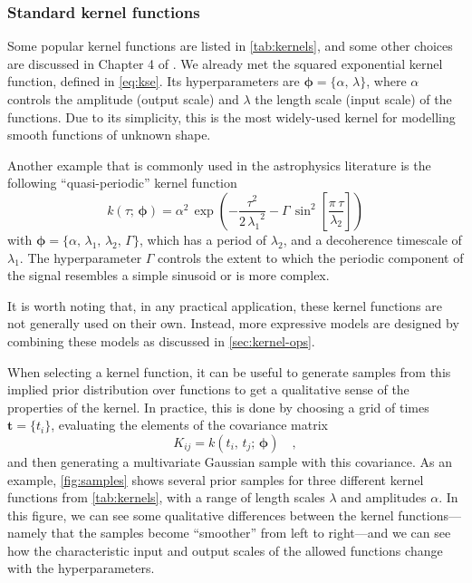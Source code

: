 \documentclass[letterpaper]{ar-1col}
\newcommand{\hyperparams}{\ensuremath{\boldsymbol{\phi}}}
\newcommand{\dt}{\ensuremath{\tau}}
\newcommand{\amplitude}{\ensuremath{\alpha}}
\newcommand{\lengthscale}{\ensuremath{\lambda}}
\begin{document}
\subsubsection{Standard kernel functions}\label{sec:standard-kernels}

Some popular kernel functions are listed in \autoref{tab:kernels}, and some other choices are discussed in Chapter 4 of \citet{gpml}. We already met the 
squared exponential kernel function, defined in \autoref{eq:kse}. Its  hyperparameters are $\hyperparams = \{\amplitude,\,\lengthscale\}$, where $\amplitude$ controls the amplitude (output scale) and $\lengthscale$ the length scale (input scale) of the functions. Due to its simplicity, this is the most widely-used kernel for modelling smooth functions of unknown shape.

Another example that is commonly used in the astrophysics literature \citep{2012MNRAS.419.3147A,2014MNRAS.443.2517H} is the following ``quasi-periodic'' kernel function
\begin{equation}
\label{eq:kqp}
  k(\dt;\,\hyperparams) = \amplitude^2\,\exp\left(-\frac{\dt^2}{2\,{\lengthscale_1}^2} -\Gamma\,\sin^2\left[\frac{\pi\,\dt}{\lengthscale_2}\right] \right)
\end{equation}
with $\hyperparams = \{\amplitude,\,\lengthscale_1,\,\lengthscale_2,\,\Gamma\}$, which has a period of $\lengthscale_2$, and a decoherence timescale of $\lengthscale_1$. The hyperparameter $\Gamma$ controls the extent to which the periodic component of the signal resembles a simple sinusoid or is more complex.

It is worth noting that, in any practical application, these kernel functions are not generally used on their own.
Instead, more expressive models are designed by combining these models as discussed in \autoref{sec:kernel-ops}.

When selecting a kernel function, it can be useful to generate samples from this implied prior distribution over functions to get a qualitative sense of the properties of the kernel.
In practice, this is done by choosing a grid of times $\boldsymbol{t} = \{t_i\}$, evaluating the elements of the covariance matrix
\begin{equation}
  K_{ij} = k(t_i,\,t_j;\,\hyperparams) \quad,
\end{equation}
and then generating a multivariate Gaussian sample with this covariance.
As an example, \autoref{fig:samples} shows several prior samples for three different kernel functions from \autoref{tab:kernels}, with a range of length scales $\lengthscale$ and amplitudes $\amplitude$.
In this figure, we can see some qualitative differences between the kernel functions---namely that the samples become ``smoother'' from left to right---and we can see how the characteristic input and output scales of the allowed functions change with the hyperparameters.
\end{document}

